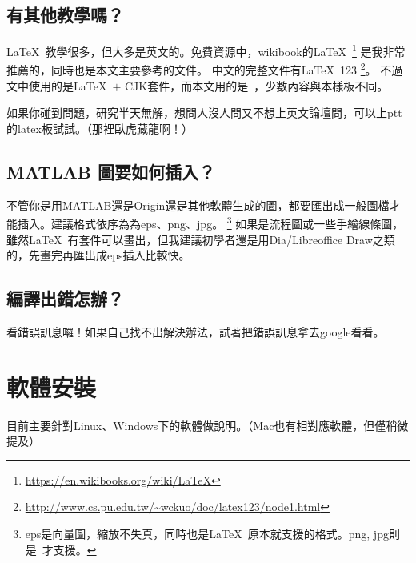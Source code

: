 \documentclass[class=NCU_thesis, crop=false, float=true]{standalone}
\begin{document}
\section{有其他教學嗎？}
\LaTeX\ 教學很多，但大多是英文的。免費資源中，wikibook的\LaTeX\ 
\footnote{\url{https://en.wikibooks.org/wiki/LaTeX}}
是我非常推薦的，同時也是本文主要參考的文件。
中文的完整文件有\LaTeX\ 123
\footnote{\url{http://www.cs.pu.edu.tw/~wckuo/doc/latex123/node1.html}}。
不過文中使用的是\LaTeX\ $+$ CJK套件，而本文用的是\XeLaTeX\ ，少數內容與本樣板不同。

如果你碰到問題，研究半天無解，想問人沒人問又不想上英文論壇問，可以上ptt的latex板試試。（那裡臥虎藏龍啊！）

\section{MATLAB 圖要如何插入？}
不管你是用MATLAB還是Origin還是其他軟體生成的圖，都要匯出成一般圖檔才能插入。建議格式依序為為eps、png、jpg。
\footnote{eps是向量圖，縮放不失真，同時也是\LaTeX\ 原本就支援的格式。png, jpg則是\XeLaTeX\ 才支援。}
如果是流程圖或一些手繪線條圖，雖然\LaTeX\ 有套件可以畫出，但我建議初學者還是用Dia/Libreoffice Draw之類的，先畫完再匯出成eps插入比較快。

\section{編譯出錯怎辦？}
看錯誤訊息囉！如果自己找不出解決辦法，試著把錯誤訊息拿去google看看。



\chapter{軟體安裝}
\label{sec:c_install}
目前主要針對Linux、Windows下的軟體做說明。（Mac也有相對應軟體，但僅稍微提及）
\end{document}
